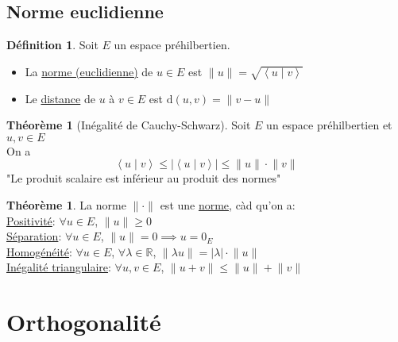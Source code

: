\documentclass[10pt,a4paper]{article}
\theoremstyle{definition}
\newtheorem{theorem}[proposition]{Théorème}
\newtheorem{definition}[proposition]{Définition}
\newcommand{\vp}[2]{\left< #1 \mid #2 \right>}
\begin{document}
\subsection{Norme euclidienne}
\begin{definition}
Soit $E$ un espace préhilbertien.
\begin{itemize}
\item La \uline{norme (euclidienne)} de $u \in E$ est $\lVert u \rVert = \sqrt{\vp{u}{v}}$
\item Le \uline{distance} de $u$ à $v \in E$ est $\text{d}(u, v) = \lVert v - u \rVert$
\end{itemize}
\end{definition}
\begin{theorem}[Inégalité de Cauchy-Schwarz]
Soit $E$ un espace préhilbertien et $u, v \in E$ \\
On a
\[ \vp{u}{v} \leq \left| \vp{u}{v} \right| \leq \lVert u \rVert \cdot \lVert v \rVert \]
"Le produit scalaire est inférieur au produit des normes"
\end{theorem}
\begin{theorem}
La norme $\lVert \cdot \rVert$ est une \uline{norme}, càd qu'on a: \\
\uline{Positivité}: $\forall u \in E$, $\lVert u \rVert \geq 0$ \\
\uline{Séparation}: $\forall u \in E$, $\lVert u \rVert = 0 \implies u = 0_E$ \\
\uline{Homogénéité}: $\forall u \in E$, $\forall \lambda \in \mathbb{R}$, $\lVert \lambda u \rVert = |\lambda| \cdot \lVert u \rVert$ \\
\uline{Inégalité triangulaire}: $\forall u, v \in E$, $\lVert u + v \rVert \leq \lVert u \rVert + \lVert v \rVert$
\end{theorem}

\section{Orthogonalité}
\end{document}
